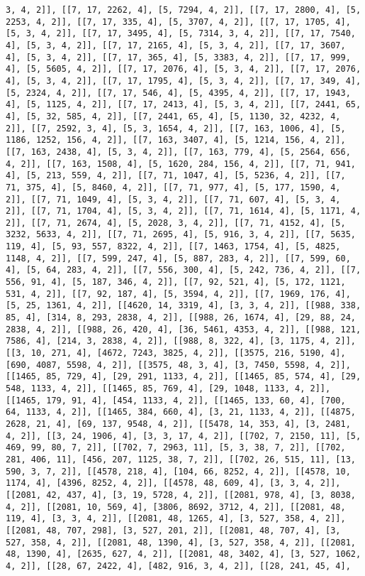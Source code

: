 \documentclass[12pt,fleqn]{article}\usepackage{../../common}
\begin{document}
\begin{verbatim}
3, 4, 2]], [[7, 17, 2262, 4], [5, 7294, 4, 2]], [[7, 17, 2800, 4], [5, 2253, 4, 2]], [[7, 17, 335, 4], [5, 3707, 4, 2]], [[7, 17, 1705, 4], [5, 3, 4, 2]], [[7, 17, 3495, 4], [5, 7314, 3, 4, 2]], [[7, 17, 7540, 4], [5, 3, 4, 2]], [[7, 17, 2165, 4], [5, 3, 4, 2]], [[7, 17, 3607, 4], [5, 3, 4, 2]], [[7, 17, 365, 4], [5, 3383, 4, 2]], [[7, 17, 999, 4], [5, 5605, 4, 2]], [[7, 17, 2076, 4], [5, 3, 4, 2]], [[7, 17, 2076, 4], [5, 3, 4, 2]], [[7, 17, 1795, 4], [5, 3, 4, 2]], [[7, 17, 349, 4], [5, 2324, 4, 2]], [[7, 17, 546, 4], [5, 4395, 4, 2]], [[7, 17, 1943, 4], [5, 1125, 4, 2]], [[7, 17, 2413, 4], [5, 3, 4, 2]], [[7, 2441, 65, 4], [5, 32, 585, 4, 2]], [[7, 2441, 65, 4], [5, 1130, 32, 4232, 4, 2]], [[7, 2592, 3, 4], [5, 3, 1654, 4, 2]], [[7, 163, 1006, 4], [5, 1186, 1252, 156, 4, 2]], [[7, 163, 3407, 4], [5, 1214, 156, 4, 2]], [[7, 163, 2438, 4], [5, 3, 4, 2]], [[7, 163, 779, 4], [5, 2564, 656, 4, 2]], [[7, 163, 1508, 4], [5, 1620, 284, 156, 4, 2]], [[7, 71, 941, 4], [5, 213, 559, 4, 2]], [[7, 71, 1047, 4], [5, 5236, 4, 2]], [[7, 71, 375, 4], [5, 8460, 4, 2]], [[7, 71, 977, 4], [5, 177, 1590, 4, 2]], [[7, 71, 1049, 4], [5, 3, 4, 2]], [[7, 71, 607, 4], [5, 3, 4, 2]], [[7, 71, 1704, 4], [5, 3, 4, 2]], [[7, 71, 1614, 4], [5, 1171, 4, 2]], [[7, 71, 2674, 4], [5, 2028, 3, 4, 2]], [[7, 71, 4152, 4], [5, 3232, 5633, 4, 2]], [[7, 71, 2695, 4], [5, 916, 3, 4, 2]], [[7, 5635, 119, 4], [5, 93, 557, 8322, 4, 2]], [[7, 1463, 1754, 4], [5, 4825, 1148, 4, 2]], [[7, 599, 247, 4], [5, 887, 283, 4, 2]], [[7, 599, 60, 4], [5, 64, 283, 4, 2]], [[7, 556, 300, 4], [5, 242, 736, 4, 2]], [[7, 556, 91, 4], [5, 187, 346, 4, 2]], [[7, 92, 521, 4], [5, 172, 1121, 531, 4, 2]], [[7, 92, 187, 4], [5, 3594, 4, 2]], [[7, 1969, 176, 4], [5, 25, 1361, 4, 2]], [[4620, 14, 3319, 4], [3, 3, 4, 2]], [[988, 338, 85, 4], [314, 8, 293, 2838, 4, 2]], [[988, 26, 1674, 4], [29, 88, 24, 2838, 4, 2]], [[988, 26, 420, 4], [36, 5461, 4353, 4, 2]], [[988, 121, 7586, 4], [214, 3, 2838, 4, 2]], [[988, 8, 322, 4], [3, 1175, 4, 2]], [[3, 10, 271, 4], [4672, 7243, 3825, 4, 2]], [[3575, 216, 5190, 4], [690, 4087, 5598, 4, 2]], [[3575, 48, 3, 4], [3, 7450, 5598, 4, 2]], [[1465, 85, 729, 4], [29, 291, 1133, 4, 2]], [[1465, 85, 574, 4], [29, 548, 1133, 4, 2]], [[1465, 85, 769, 4], [29, 1048, 1133, 4, 2]], [[1465, 179, 91, 4], [454, 1133, 4, 2]], [[1465, 133, 60, 4], [700, 64, 1133, 4, 2]], [[1465, 384, 660, 4], [3, 21, 1133, 4, 2]], [[4875, 2628, 21, 4], [69, 137, 9548, 4, 2]], [[5478, 14, 353, 4], [3, 2481, 4, 2]], [[3, 24, 1906, 4], [3, 3, 17, 4, 2]], [[702, 7, 2150, 11], [5, 469, 99, 80, 7, 2]], [[702, 7, 2963, 11], [5, 3, 38, 7, 2]], [[702, 281, 406, 11], [456, 207, 1125, 38, 7, 2]], [[702, 26, 515, 11], [13, 590, 3, 7, 2]], [[4578, 218, 4], [104, 66, 8252, 4, 2]], [[4578, 10, 1174, 4], [4396, 8252, 4, 2]], [[4578, 48, 609, 4], [3, 3, 4, 2]], [[2081, 42, 437, 4], [3, 19, 5728, 4, 2]], [[2081, 978, 4], [3, 8038, 4, 2]], [[2081, 10, 569, 4], [3806, 8692, 3712, 4, 2]], [[2081, 48, 119, 4], [3, 3, 4, 2]], [[2081, 48, 1265, 4], [3, 527, 358, 4, 2]], [[2081, 48, 707, 298], [3, 527, 201, 2]], [[2081, 48, 707, 4], [3, 527, 358, 4, 2]], [[2081, 48, 1390, 4], [3, 527, 358, 4, 2]], [[2081, 48, 1390, 4], [2635, 627, 4, 2]], [[2081, 48, 3402, 4], [3, 527, 1062, 4, 2]], [[28, 67, 2422, 4], [482, 916, 3, 4, 2]], [[28, 241, 45, 4], 
\end{verbatim}
\end{document}
